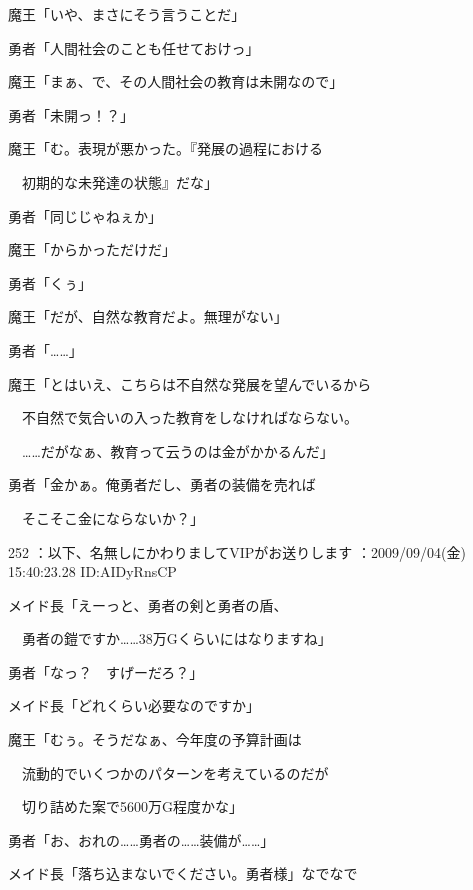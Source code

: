 \documentclass[a4j,twocolumn]{tarticle}
\begin{document}
魔王「いや、まさにそう言うことだ」\par{} 
勇者「人間社会のことも任せておけっ」 



魔王「まぁ、で、その人間社会の教育は未開なので」\par{} 
勇者「未開っ！？」 



魔王「む。表現が悪かった。『発展の過程における\par{} 
　初期的な未発達の状態』だな」\par{} 
勇者「同じじゃねぇか」 



魔王「からかっただけだ」\par{} 
勇者「くぅ」 



魔王「だが、自然な教育だよ。無理がない」\par{} 
勇者「……」 



魔王「とはいえ、こちらは不自然な発展を望んでいるから\par{} 
　不自然で気合いの入った教育をしなければならない。\par{} 
　……だがなぁ、教育って云うのは金がかかるんだ」 



勇者「金かぁ。俺勇者だし、勇者の装備を売れば\par{} 
　そこそこ金にならないか？」 

	
    
    

252 ：以下、名無しにかわりましてVIPがお送りします ：2009/09/04(金) 15:40:23.28 ID:AIDyRnsCP 


メイド長「えーっと、勇者の剣と勇者の盾、\par{} 
　勇者の鎧ですか……38万Gくらいにはなりますね」 



勇者「なっ？　すげーだろ？」 



メイド長「どれくらい必要なのですか」 



魔王「むぅ。そうだなぁ、今年度の予算計画は\par{} 
　流動的でいくつかのパターンを考えているのだが\par{} 
　切り詰めた案で5600万G程度かな」 



勇者「お、おれの……勇者の……装備が……」\par{} 
メイド長「落ち込まないでください。勇者様」なでなで 
\end{document}
